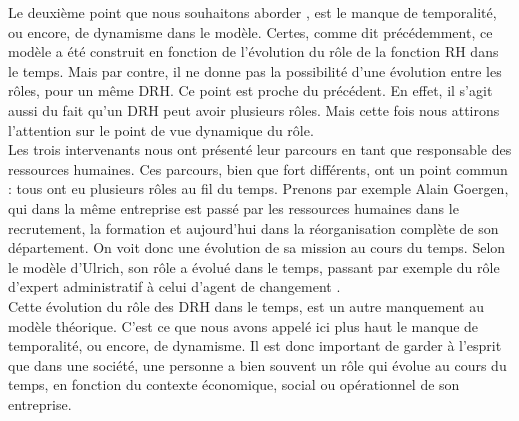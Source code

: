 
Le deuxième point que nous souhaitons aborder %
, est le manque de temporalité, ou encore, de dynamisme dans le modèle. Certes, comme dit précédemment, ce modèle a été construit en fonction de l'évolution du rôle de la fonction RH dans le temps. Mais  par contre, il ne donne pas la possibilité d'une évolution entre les rôles, pour un même DRH. Ce point est proche du précédent. En effet, il s'agit aussi du fait qu'un DRH peut avoir plusieurs rôles. Mais cette fois nous attirons l'attention sur le point de vue dynamique du rôle. \\ %


Les trois intervenants nous ont présenté leur parcours en tant que responsable des ressources humaines. Ces parcours, bien que fort différents, ont un point commun : tous ont eu plusieurs rôles au fil du temps. Prenons par exemple Alain Goergen, qui dans la même entreprise est passé par les ressources humaines dans le recrutement, la formation et aujourd'hui dans la réorganisation complète de son département. On voit donc une évolution de sa mission au cours du temps. Selon le modèle d'Ulrich, son rôle a évolué dans le temps, passant par exemple du rôle d'\og expert administratif \fg{} à celui d'\og agent de changement \fg{}. \\ 

Cette évolution du rôle des DRH dans le temps, est un autre manquement au modèle théorique. C'est ce que nous avons appelé ici plus haut le manque de temporalité, ou encore, de dynamisme. Il est donc important de garder à l'esprit que dans une société, une personne a bien souvent un rôle qui évolue au cours du temps, en fonction du contexte économique, social ou opérationnel de son entreprise. \\ %


